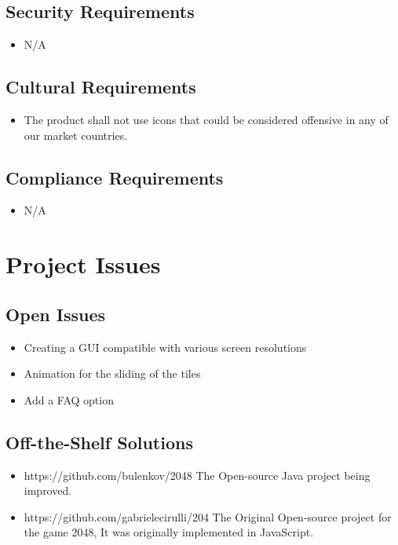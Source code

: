 \subsection{Security Requirements}
\begin{itemize}
\item N/A
\end{itemize}

\subsection{Cultural Requirements}
\begin{itemize}
\item The product shall not use icons that could be considered offensive in any of our market countries.
\end{itemize}

\subsection{Compliance Requirements}
\begin{itemize}
\item N/A
\end{itemize}

\section{Project Issues}
\subsection{Open Issues}
\begin{itemize}
	\item Creating a GUI compatible with various screen resolutions
	\item Animation for the sliding of the tiles
	\item Add a FAQ option
\end{itemize}

\subsection{Off-the-Shelf Solutions}
\begin{itemize}
	\item https://github.com/bulenkov/2048 The Open-source Java project being 
	improved.
	\item https://github.com/gabrielecirulli/204 The Original Open-source 
	project for the game 2048, It was originally implemented in JavaScript.
\end{itemize}


